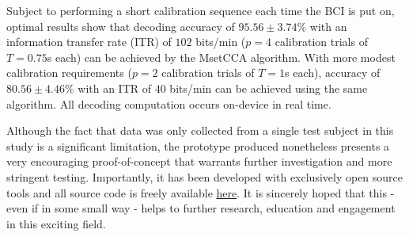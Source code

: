 \noindent
Subject to performing a short calibration sequence each time the BCI is put on, optimal results show that decoding accuracy of $95.56 \pm 3.74\%$ with an information transfer rate (ITR) of $102$ bits/min ($p=4$ calibration trials of $T=0.75$s each) can be achieved by the MsetCCA algorithm. With more modest calibration requirements ($p=2$ calibration trials of $T=1$s each), accuracy of $80.56 \pm 4.46\%$ with an ITR of $40$ bits/min can be achieved using the same algorithm. All decoding computation occurs on-device in real time. 
\vspace{0.4cm}

\noindent
Although the fact that data was only collected from a single test subject in this study is a significant limitation, the prototype produced nonetheless presents a very encouraging proof-of-concept that warrants further investigation and more stringent testing. Importantly, it has been developed with exclusively open source tools and all source code is freely available \href{https://github.com/JamesTev/EEG-decoding}{here}. It is sincerely hoped that this - even if in some small way - helps to further research, education and engagement in this exciting field.



